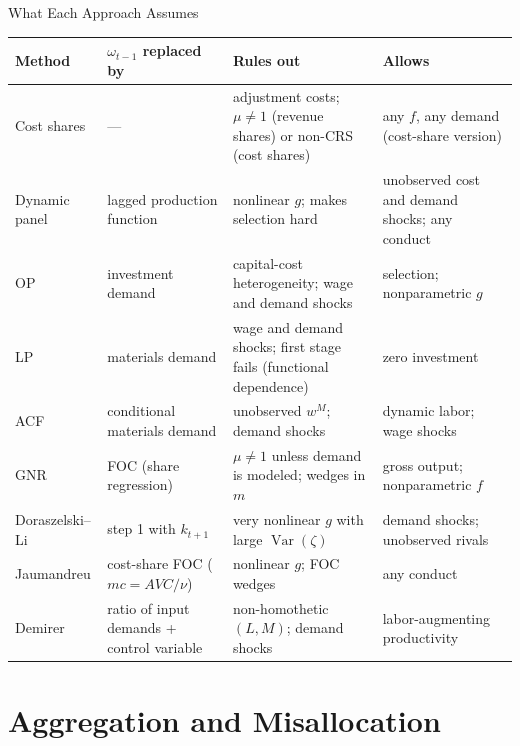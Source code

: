 \documentclass[aspectratio=169,10pt]{beamer}
\begin{document}
\begin{frame}{What Each Approach Assumes}
\scriptsize
\renewcommand{\arraystretch}{1.25}
\begin{tabularx}{\textwidth}{@{}l l X X@{}}
\toprule
Method & $\omega_{t-1}$ replaced by & Rules out & Allows \\
\midrule
Cost shares & --- & adjustment costs; $\mu \ne 1$ (revenue shares) or non-CRS (cost shares) & any $f$, any demand (cost-share version) \\
Dynamic panel & lagged production function & nonlinear $g$; makes selection hard & unobserved cost and demand shocks; any conduct \\
OP & investment demand & capital-cost heterogeneity; wage and demand shocks & selection; nonparametric $g$ \\
LP & materials demand & wage and demand shocks; first stage fails (functional dependence) & zero investment \\
ACF & conditional materials demand & unobserved $w^M$; demand shocks & dynamic labor; wage shocks \\
GNR & FOC (share regression) & $\mu \neq 1$ unless demand is modeled; wedges in $m$ & gross output; nonparametric $f$ \\
Doraszelski--Li & step 1 with $k_{t+1}$ & very nonlinear $g$ with large $\operatorname{Var}(\zeta)$ & demand shocks; unobserved rivals \\
Jaumandreu & cost-share FOC ($mc = AVC/\nu$) & nonlinear $g$; FOC wedges & any conduct \\
Demirer & ratio of input demands + control variable & non-homothetic $(L,M)$; demand shocks & labor-augmenting productivity \\
\bottomrule
\end{tabularx}
\end{frame}


\section{Aggregation and Misallocation}
\end{document}
